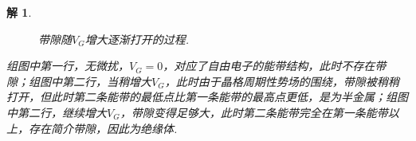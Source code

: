 \documentclass[UTF8,10pt,a4paper]{article}
\theoremstyle{Problem}
\theoremstyle{Solution}
\newtheorem*{sol}{解}
\begin{document}
\begin{sol}
\begin{figure}[h]
        \caption{带隙随$V_G$增大逐渐打开的过程.}
        \label{3-E-k}
    \end{figure}

    组图中第一行，无微扰，$V_G=0$，对应了自由电子的能带结构，此时不存在带隙；组图中第二行，当稍增大$V_G$，此时由于晶格周期性势场的围绕，带隙被稍稍打开，但此时第二条能带的最低点比第一条能带的最高点更低，是为半金属；组图中第二行，继续增大$V_G$，带隙变得足够大，此时第二条能带完全在第一条能带以上，存在简介带隙，因此为绝缘体.


\end{sol}
\end{document}
